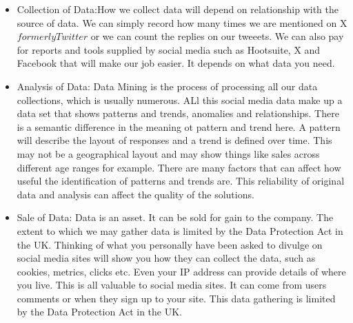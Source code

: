 \documentclass{article}
\begin{document}
\begin{itemize}
\item Collection of Data:How we collect data will depend on relationship with the source of data. We can simply record how many times we are mentioned on X \(formerly Twitter \) or we can count the replies on our tweeets. We can also pay for reports and tools supplied by social media such as Hootsuite, X and Facebook that will make our job easier. It depends on what data you need.
\item Analysis of Data: Data Mining is the process of processing all our data collections, which is usually numerous. ALl this social media data make up a data set that shows patterns and trends, anomalies and relationships. There is a semantic difference in the meaning ot pattern and trend here. A pattern will describe the layout of responses and a trend is defined over time. This may not be a geographical layout and may show things like sales across different age ranges for example. There are many factors that can affect how useful the identification of patterns and trends are. This reliability of original data and analysis can affect  the quality of the solutions.
\item Sale of Data: Data is an asset. It can be sold for gain to the company. The extent to which we may gather data is limited by the Data Protection Act in the UK. Thinking of what you personally have been asked to divulge on social media sites will show you how they can collect the data, such as cookies, metrics, clicks etc. Even your IP address can provide details of where you live. This is all valuable to social media sites. It can come from users comments or when they sign up to your site. This data gathering is limited by the Data Protection Act in the UK.

\end{itemize}




\end{document}
